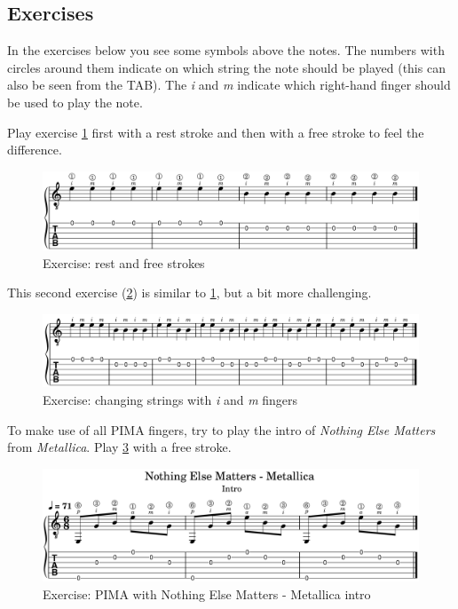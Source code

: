 \newpage

\subsection{Exercises}

In the exercises below you see some symbols above the notes. The numbers with circles around them indicate on which string the note should be played (this can also be seen from the TAB). The \textit{i} and \textit{m} indicate which right-hand finger should be used to play the note.

Play exercise \ref{fig:exercise_rest_free_stroke} first with a rest stroke and then with a free stroke to feel the difference.

\begin{figure}[h]
    \centering
    \includegraphics[width=\textwidth]{../MuseScore/Guitar/OpenEnVallendeAanslag.png}
    \caption{Exercise: rest and free strokes}
    \label{fig:exercise_rest_free_stroke}
\end{figure}

This second exercise (\ref{fig:exercise_i_m_string_change}) is similar to \ref{fig:exercise_rest_free_stroke}, but a bit more challenging.

\begin{figure}[h]
    \centering
    \includegraphics[width=\textwidth]{../MuseScore/Guitar/TwoStringAlternating.png}
    \caption{Exercise: changing strings with \textit{i} and \textit{m} fingers}
    \label{fig:exercise_i_m_string_change}
\end{figure}

To make use of all PIMA fingers, try to play the intro of \textit{Nothing Else Matters} from \textit{Metallica}. Play \ref{fig:exercise_nothing_else_matters_metallica_intro_pima} with a free stroke.

\begin{figure}[h]
    \centering
    \includegraphics[width=\textwidth]{../MuseScore/Guitar/NothinElseMatters_Metallica_Intro.png}
    \caption{Exercise: PIMA with Nothing Else Matters - Metallica intro}
    \label{fig:exercise_nothing_else_matters_metallica_intro_pima}
\end{figure}

